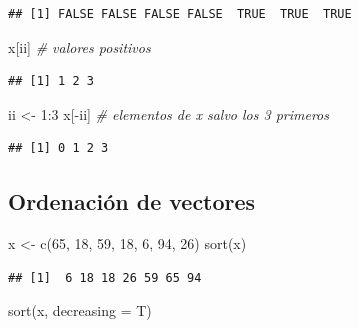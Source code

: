 \documentclass[
]{book}
\newenvironment{Shaded}{\begin{snugshade}}{\end{snugshade}}
\newcommand{\AttributeTok}[1]{\textcolor[rgb]{0.77,0.63,0.00}{#1}}
\newcommand{\CommentTok}[1]{\textcolor[rgb]{0.56,0.35,0.01}{\textit{#1}}}
\newcommand{\DecValTok}[1]{\textcolor[rgb]{0.00,0.00,0.81}{#1}}
\newcommand{\FunctionTok}[1]{\textcolor[rgb]{0.00,0.00,0.00}{#1}}
\newcommand{\NormalTok}[1]{#1}
\newcommand{\OtherTok}[1]{\textcolor[rgb]{0.56,0.35,0.01}{#1}}
\newcommand{\SpecialCharTok}[1]{\textcolor[rgb]{0.00,0.00,0.00}{#1}}
\theoremstyle{break}
\begin{document}
\begin{verbatim}
## [1] FALSE FALSE FALSE FALSE  TRUE  TRUE  TRUE
\end{verbatim}

\begin{Shaded}
\begin{Highlighting}[]
\NormalTok{x[ii]  }\CommentTok{\# valores positivos}
\end{Highlighting}
\end{Shaded}

\begin{verbatim}
## [1] 1 2 3
\end{verbatim}

\begin{Shaded}
\begin{Highlighting}[]
\NormalTok{ii }\OtherTok{\textless{}{-}} \DecValTok{1}\SpecialCharTok{:}\DecValTok{3}
\NormalTok{x[}\SpecialCharTok{{-}}\NormalTok{ii]  }\CommentTok{\# elementos de x salvo los 3 primeros}
\end{Highlighting}
\end{Shaded}

\begin{verbatim}
## [1] 0 1 2 3
\end{verbatim}

\hypertarget{ordenaciuxf3n-de-vectores}{%
\subsection{Ordenación de vectores}\label{ordenaciuxf3n-de-vectores}}

\begin{Shaded}
\begin{Highlighting}[]
\NormalTok{x }\OtherTok{\textless{}{-}} \FunctionTok{c}\NormalTok{(}\DecValTok{65}\NormalTok{, }\DecValTok{18}\NormalTok{, }\DecValTok{59}\NormalTok{, }\DecValTok{18}\NormalTok{, }\DecValTok{6}\NormalTok{, }\DecValTok{94}\NormalTok{, }\DecValTok{26}\NormalTok{)}
\FunctionTok{sort}\NormalTok{(x)}
\end{Highlighting}
\end{Shaded}

\begin{verbatim}
## [1]  6 18 18 26 59 65 94
\end{verbatim}

\begin{Shaded}
\begin{Highlighting}[]
\FunctionTok{sort}\NormalTok{(x, }\AttributeTok{decreasing =}\NormalTok{ T)}
\end{Highlighting}
\end{Shaded}
\end{document}
